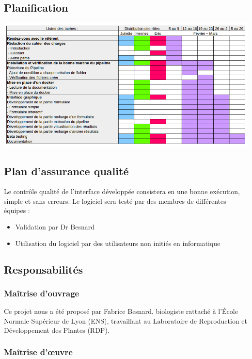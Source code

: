 \documentclass[12pt]{article}
\begin{document}
\subsection{Planification}

\includegraphics[scale=0.6]{gantt.png}

\subsection{Plan d'assurance qualité}

Le contrôle qualité de l'interface développée consistera en une bonne exécution, simple et sans erreurs. Le logiciel sera testé par des membres de différentes équipes :

\begin{itemize}
\item Validation par Dr Besnard
\item Utilisation du logiciel par des utilisateurs non initiés en informatique
\end{itemize}

\subsection{Responsabilités}
\subsubsection{Maîtrise d'ouvrage}

Ce projet nous a été proposé par Fabrice Besnard, biologiste rattaché à l’École Normale Supérieur de Lyon (ENS), travaillant au Laboratoire de Reproduction et Développement des Plantes (RDP).

\subsubsection{Maîtrise d’œuvre}
\end{document}
